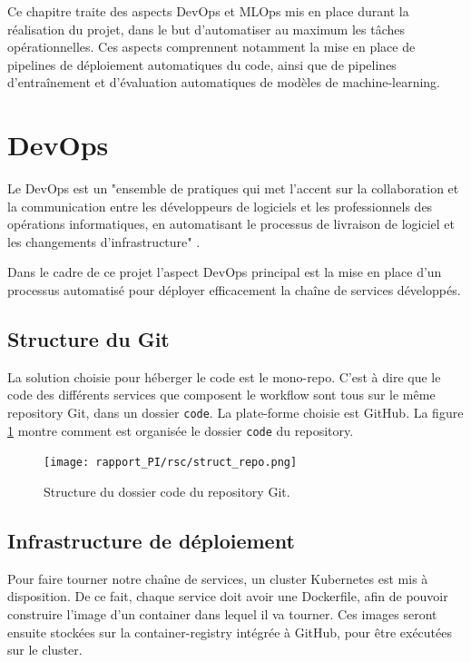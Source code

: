 Ce chapitre traite des aspects DevOps et MLOps mis en place durant la réalisation du projet, dans le but d'automatiser au maximum les tâches opérationnelles. Ces aspects comprennent notamment la mise en place de pipelines de déploiement automatiques du code, ainsi que de pipelines d'entraînement et d'évaluation automatiques de modèles de machine-learning.

\section{DevOps}
Le DevOps est un "ensemble de pratiques qui met l’accent sur la collaboration et la communication entre les développeurs de logiciels et les professionnels des opérations informatiques, en automatisant le processus de livraison de logiciel et les changements d’infrastructure" \cite{devops}.

Dans le cadre de ce projet l'aspect DevOps principal est la mise en place d'un processus automatisé pour déployer efficacement la chaîne de services développés.

\subsection{Structure du Git}
La solution choisie pour héberger le code est le mono-repo. C'est à dire que le code des différents services que composent le workflow sont tous sur le même repository Git, dans un dossier \verb|code|. La plate-forme choisie est GitHub. La figure \ref{fig:repo} montre comment est organisée le dossier \verb|code| du repository.

\begin{figure}[H]
    \centering
    \texttt{[image: rapport\_PI/rsc/struct\_repo.png]}
    \caption{Structure du dossier code du repository Git.}
    \label{fig:repo}
\end{figure}

\subsection{Infrastructure de déploiement}
Pour faire tourner notre chaîne de services, un cluster Kubernetes est mis à disposition. De ce fait, chaque service doit avoir une Dockerfile, afin de pouvoir construire l'image d'un container dans lequel il va tourner. Ces images seront ensuite stockées sur la container-registry intégrée à GitHub, pour être exécutées sur le cluster.

